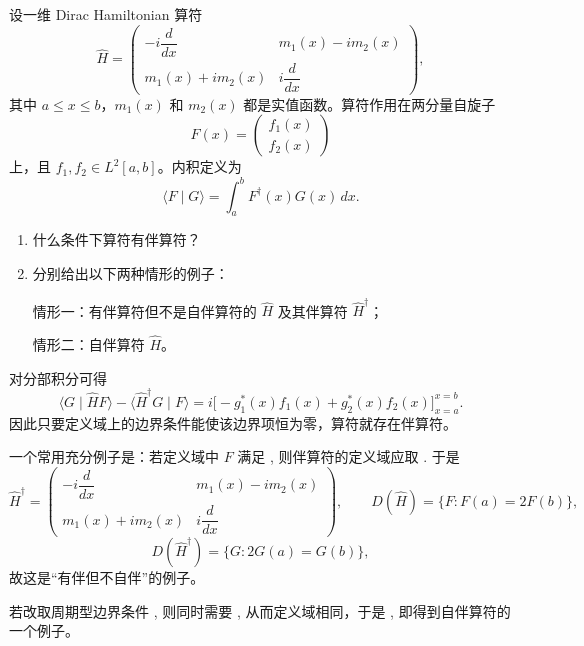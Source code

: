 \begin{question}[20分]

设一维 Dirac Hamiltonian 算符
\[
\hat H=
\begin{pmatrix}
-i\dfrac{d}{dx} & m_1(x)-im_2(x)\\[4pt]
m_1(x)+im_2(x) & i\dfrac{d}{dx}
\end{pmatrix},
\]
其中 $a\le x\le b$，$m_1(x)$ 和 $m_2(x)$ 都是实值函数。算符作用在两分量自旋子
\[
F(x)=\begin{pmatrix}f_1(x)\\ f_2(x)\end{pmatrix}
\]
上，且 $f_1,f_2\in L^2[a,b]$。内积定义为
\[
\langle F\mid G\rangle=\int_a^b F^{\dagger}(x)G(x)\,dx.
\]
\begin{enumerate}[label=（\arabic*）,leftmargin=2.8em,itemsep=0.2em]
\item 什么条件下算符有伴算符？
\item 分别给出以下两种情形的例子：

情形一：有伴算符但不是自伴算符的 $\hat H$ 及其伴算符 $\hat H^{\dagger}$；

情形二：自伴算符 $\hat H$。
\end{enumerate}

\begin{solution}

对分部积分可得
\[
\langle G\mid \hat HF\rangle-\langle \hat H^{\dagger}G\mid F\rangle
=i\bigl[-g_1^*(x)f_1(x)+g_2^*(x)f_2(x)\bigr]_{x=a}^{x=b}.
\]
因此只要定义域上的边界条件能使该边界项恒为零，算符就存在伴算符。

一个常用充分例子是：若定义域中 $F$ 满足
,
则伴算符的定义域应取
.
于是
\[
\hat H^{\dagger}=
\begin{pmatrix}
-i\dfrac{d}{dx} & m_1(x)-im_2(x)\\[4pt]
m_1(x)+im_2(x) & i\dfrac{d}{dx}
\end{pmatrix},
\qquad D(\hat H)=\{F:F(a)=2F(b)\},
\]
\[
D(\hat H^{\dagger})=\{G:2G(a)=G(b)\},
\]
故这是“有伴但不自伴”的例子。

若改取周期型边界条件
,
则同时需要
,
从而定义域相同，于是
,
即得到自伴算符的一个例子。

\end{solution}
\end{question}

